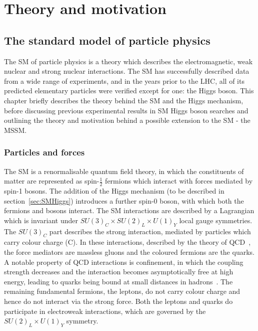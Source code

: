 \chapter{Theory and motivation}
\label{chap:theory}

\section{The standard model of particle physics}
\label{sec:theSM}

The \ac{SM} of particle physics is a theory
which describes the electromagnetic, weak nuclear and strong nuclear
interactions. The \ac{SM} has successfully described data from a wide range of experiments, and in the 
years prior to the LHC, all of its predicted elementary particles were verified 
except for one: the Higgs boson. This chapter briefly describes the theory
behind the \ac{SM} and the Higgs mechanism, before discussing previous
experimental results in \ac{SM} Higgs boson searches and outlining the theory
and motivation behind a possible extension to the \ac{SM} - the \ac{MSSM}.

\subsection{Particles and forces} 
\label{sec:particlesandforces}

The \ac{SM} is a renormalisable quantum field theory, in which the constituents of
matter are represented as spin-$\frac{1}{2}$ fermions which interact with
forces mediated by spin-1 bosons. The addition of the Higgs mechanism (to be
described in section~\ref{sec:SMHiggs})
introduces a further spin-0 boson, with which both the fermions and bosons
interact. The \ac{SM} interactions are described by a
Lagrangian which is invariant under $SU(3)_{C} \times SU(2)_{L} \times U(1)_{Y}$
local gauge symmetries. The $SU(3)_{C}$ part describes the strong interaction, mediated by
particles which carry colour charge (C). In these interactions, described by the
theory of \ac{QCD}~\cite{Griffiths:2008nx,Perkins:2000uq}, the force mediators are massless gluons
and the coloured fermions are the quarks. A notable property of \ac{QCD} interactions
is confinement, in which the coupling strength decreases and the interaction
becomes asymptotically free at high energy, leading to quarks being bound at 
small distances in hadrons~\cite{Gross:1973id,Politzer:1973fx}. The remaining fundamental fermions,
the leptons, do not carry colour charge and hence do not interact via the strong
force. Both the leptons and quarks do participate in electroweak interactions,
which are governed by the $SU(2)_{L} \times U(1)_{Y}$ symmetry.

